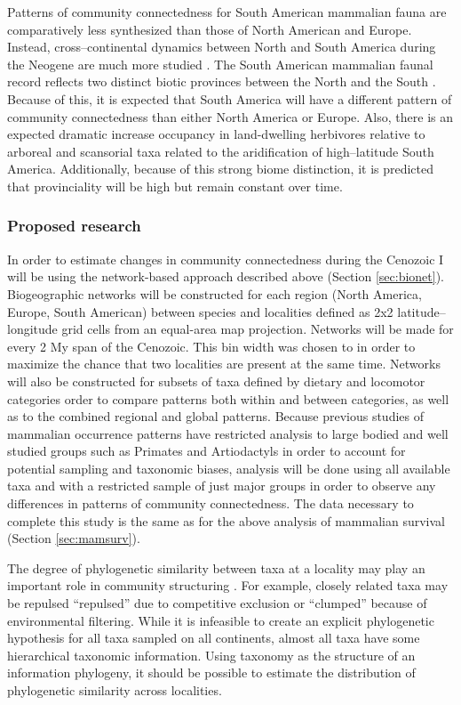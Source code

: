 \documentclass[12pt,letterpaper]{article}
\begin{document}
Patterns of community connectedness for South American mammalian fauna are comparatively less synthesized than those of North American and Europe. Instead, cross--continental dynamics between North and South America during the Neogene are much more studied \citep{Marshall1982}. The South American mammalian faunal record reflects two distinct biotic provinces between the North and the South \citep{Macfadden1997,Macfadden2006,Flynn1998a,Patterson1968}. Because of this, it is expected that South America will have a different pattern of community connectedness than either North America or Europe. Also, there is an expected dramatic increase occupancy in land-dwelling herbivores relative to arboreal and scansorial taxa related to the aridification of high--latitude South America. Additionally, because of this strong biome distinction, it is predicted that provinciality will be high but remain constant over time. %

\subsubsection{Proposed research} \label{sec:mamcommeth}
In order to estimate changes in community connectedness during the Cenozoic I will be using the network-based approach described above (Section \ref{sec:bionet}). Biogeographic networks will be constructed for each region (North America, Europe, South American) between species and localities defined as 2x2 latitude--longitude grid cells from an equal-area map projection. Networks will be made for every 2 My span of the Cenozoic. This bin width was chosen to in order to maximize the chance that two localities are present at the same time. Networks will also be constructed for subsets of taxa defined by dietary and locomotor categories order to compare patterns both within and between categories, as well as to the combined regional and global patterns. Because previous studies of mammalian occurrence patterns have restricted analysis to large bodied and well studied groups such as Primates and Artiodactyls in order to account for potential sampling and taxonomic biases, analysis will be done using all available taxa and with a restricted sample of just major groups in order to observe any differences in patterns of community connectedness.  The data necessary to complete this study is the same as for the above analysis of mammalian survival (Section \ref{sec:mamsurv}).

The degree of phylogenetic similarity between taxa at a locality may play an important role in community structuring \citep{Webb2002}. For example, closely related taxa may be repulsed ``repulsed'' due to competitive exclusion or ``clumped'' because of environmental filtering. While it is infeasible to create an explicit phylogenetic hypothesis for all taxa sampled on all continents, almost all taxa have some hierarchical taxonomic information. Using taxonomy as the structure of an information phylogeny, it should be possible to estimate the distribution of phylogenetic similarity across localities.
\end{document}

